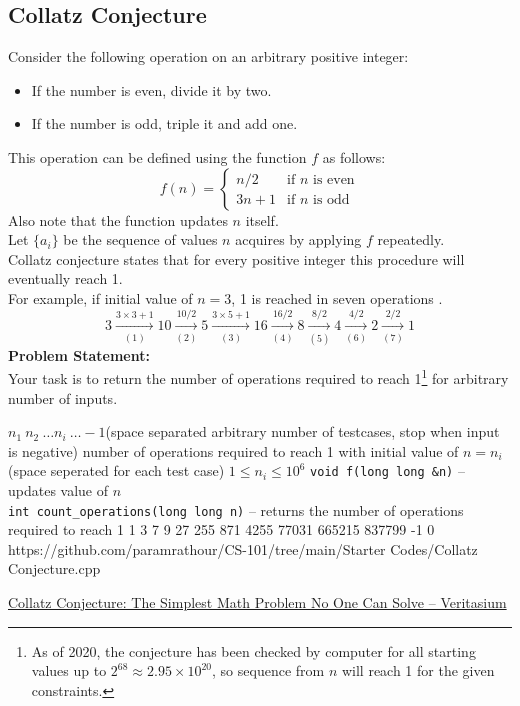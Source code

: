 \documentclass[../../Problems]{subfiles}
\begin{document}
\subsection{Collatz Conjecture}
Consider the following operation on an arbitrary positive integer:
\begin{itemize}
	\item If the number is even, divide it by two.
	\item If the number is odd, triple it and add one.
\end{itemize}
This operation can be defined using the function $f$ as follows:
\begin{equation}
f(n) = \begin{cases}
	n/2 & \text{if $n$ is even}\\
	3n+1 & \text{if $n$ is odd}
\end{cases}
\end{equation}
Also note that the function updates $n$ itself.\\
Let $\{a_i\}$ be the sequence of values $n$ acquires by applying $f$ repeatedly.\\
Collatz conjecture states that for every positive integer this procedure will eventually reach 1.\\
For example, if initial value of $n=3$, 1 is reached in seven operations .
\begin{equation*}
3\xrightarrow[(1)]{3\times3+1}10\xrightarrow[(2)]{10/2}5\xrightarrow[(3)]{3\times5+1}16\xrightarrow[(4)]{16/2}8\xrightarrow[(5)]{8/2}4\xrightarrow[(6)]{4/2}2\xrightarrow[(7)]{2/2}1
\end{equation*}
\textbf{Problem Statement:}\\
Your task is to return the number of operations required to reach 1\footnote{As of 2020, the conjecture has been checked by computer for all starting values up to $2^{68} \approx 2.95 \times 10^{20}$, so sequence from $n$ will reach 1 for the given constraints.} for arbitrary number of inputs.
\begin{testcasesFunction}
	{$n_1\ n_2\ \ldots n_i\ \ldots -1$\hfill(space separated arbitrary number of testcases, stop when input is negative)}
	{number of operations required to reach 1 with initial value of $n = n_i$ \hfill(space seperated for each test case)}
	{$1 \leq n_i \leq 10^{6}$}
	{\texttt{void f(long long \&n)} -- updates value of $n$\\
	\texttt{int count\_operations(long long n)} -- returns the number of operations required to reach 1}
	{1 3 7 9 27 255 871 4255 77031 665215 837799 -1}
	{0}
	{https://github.com/paramrathour/CS-101/tree/main/Starter Codes/Collatz Conjecture.cpp}
\end{testcasesFunction}
\begin{funvideo}
\href{https://youtu.be/094y1Z2wpJg}{Collatz Conjecture: The Simplest Math Problem No One Can Solve -- Veritasium}
\end{funvideo}
\end{document}
